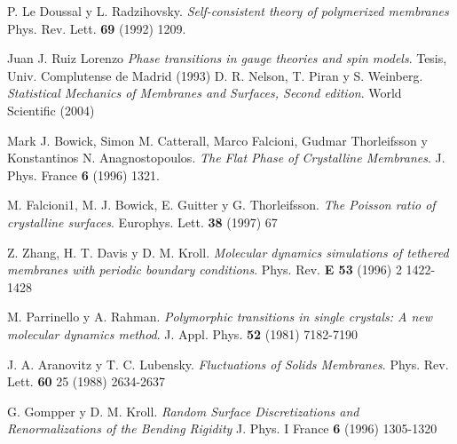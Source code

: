 \begin{thebibliography}{99}
P. Le Doussal y L. Radzihovsky.
  \textit{Self-consistent theory of polymerized membranes}
  Phys. Rev. Lett. \textbf{69} (1992) 1209.

 Juan J. Ruiz Lorenzo
    \textit{Phase transitions in gauge theories and spin models}.
    Tesis, Univ. Complutense de Madrid (1993) 
  D. R. Nelson, T. Piran y S. Weinberg. 
  \textit{Statistical Mechanics of Membranes and Surfaces, Second edition}. 
  World Scientific (2004)

 Mark J. Bowick, Simon M. Catterall, Marco
  Falcioni, Gudmar Thorleifsson y Konstantinos N. Anagnostopoulos. 
  \textit{The Flat Phase of Crystalline Membranes}. 
  J. Phys. France \textbf{6} (1996) 1321.

 M. Falcioni1, M. J. Bowick, E. Guitter y
  G. Thorleifsson.
  \textit{The Poisson ratio of crystalline surfaces}. 
  Europhys. Lett. \textbf{38} (1997) 67

 Z. Zhang, H. T. Davis y D. M. Kroll.
\textit{Molecular dynamics simulations of tethered membranes with periodic
  boundary conditions}.
 Phys. Rev. \textbf{E 53} (1996) 2 1422-1428

 M. Parrinello y A. Rahman.
\textit{Polymorphic transitions in single crystals: A new molecular dynamics
  method}.
J. Appl. Phys. \textbf{52} (1981) 7182-7190  

 J. A. Aranovitz y T. C. Lubensky. 
\textit{Fluctuations of Solids Membranes}.
Phys. Rev. Lett. \textbf{60} 25 (1988) 2634-2637

G. Gompper y D. M. Kroll.
\textit{Random Surface Discretizations and Renormalizations of the Bending
  Rigidity}
J. Phys. I France \textbf{6} (1996) 1305-1320

\end{thebibliography}


